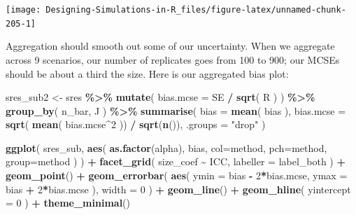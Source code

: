 \documentclass[
]{book}
\newenvironment{Shaded}{\begin{snugshade}}{\end{snugshade}}
\newcommand{\AttributeTok}[1]{\textcolor[rgb]{0.13,0.29,0.53}{#1}}
\newcommand{\DecValTok}[1]{\textcolor[rgb]{0.00,0.00,0.81}{#1}}
\newcommand{\FunctionTok}[1]{\textcolor[rgb]{0.13,0.29,0.53}{\textbf{#1}}}
\newcommand{\NormalTok}[1]{#1}
\newcommand{\OtherTok}[1]{\textcolor[rgb]{0.56,0.35,0.01}{#1}}
\newcommand{\SpecialCharTok}[1]{\textcolor[rgb]{0.81,0.36,0.00}{\textbf{#1}}}
\newcommand{\StringTok}[1]{\textcolor[rgb]{0.31,0.60,0.02}{#1}}
\begin{document}
\begin{center}\texttt{[image: Designing-Simulations-in-R\_files/figure-latex/unnamed-chunk-205-1]} \end{center}

Aggregation should smooth out some of our uncertainty.
When we aggregate across 9 scenarios, our number of replicates goes from 100 to 900; our MCSEs should be about a third the size.
Here is our aggregated bias plot:

\begin{Shaded}
\begin{Highlighting}[]
\NormalTok{sres\_sub2 }\OtherTok{\textless{}{-}}\NormalTok{ sres }\SpecialCharTok{\%\textgreater{}\%}
  \FunctionTok{mutate}\NormalTok{( }\AttributeTok{bias.mcse =}\NormalTok{ SE }\SpecialCharTok{/} \FunctionTok{sqrt}\NormalTok{( R ) ) }\SpecialCharTok{\%\textgreater{}\%}
  \FunctionTok{group\_by}\NormalTok{( n\_bar, J ) }\SpecialCharTok{\%\textgreater{}\%}
  \FunctionTok{summarise}\NormalTok{( }\AttributeTok{bias =} \FunctionTok{mean}\NormalTok{( bias ),}
             \AttributeTok{bias.mcse =} \FunctionTok{sqrt}\NormalTok{( }\FunctionTok{mean}\NormalTok{( bias.mcse}\SpecialCharTok{\^{}}\DecValTok{2}\NormalTok{ )) }\SpecialCharTok{/} \FunctionTok{sqrt}\NormalTok{(}\FunctionTok{n}\NormalTok{()),}
             \AttributeTok{.groups =} \StringTok{"drop"}\NormalTok{ )}

\FunctionTok{ggplot}\NormalTok{( sres\_sub, }\FunctionTok{aes}\NormalTok{( }\FunctionTok{as.factor}\NormalTok{(alpha), bias, }
                       \AttributeTok{col=}\NormalTok{method, }\AttributeTok{pch=}\NormalTok{method, }\AttributeTok{group=}\NormalTok{method ) ) }\SpecialCharTok{+}
  \FunctionTok{facet\_grid}\NormalTok{( size\_coef }\SpecialCharTok{\textasciitilde{}}\NormalTok{ ICC, }\AttributeTok{labeller =}\NormalTok{ label\_both ) }\SpecialCharTok{+}
  \FunctionTok{geom\_point}\NormalTok{() }\SpecialCharTok{+} 
  \FunctionTok{geom\_errorbar}\NormalTok{( }\FunctionTok{aes}\NormalTok{( }\AttributeTok{ymin =}\NormalTok{ bias }\SpecialCharTok{{-}} \DecValTok{2}\SpecialCharTok{*}\NormalTok{bias.mcse, }
                      \AttributeTok{ymax =}\NormalTok{ bias }\SpecialCharTok{+} \DecValTok{2}\SpecialCharTok{*}\NormalTok{bias.mcse ), }
                 \AttributeTok{width =} \DecValTok{0}\NormalTok{ ) }\SpecialCharTok{+}
  \FunctionTok{geom\_line}\NormalTok{() }\SpecialCharTok{+}
  \FunctionTok{geom\_hline}\NormalTok{( }\AttributeTok{yintercept =} \DecValTok{0}\NormalTok{ ) }\SpecialCharTok{+}
  \FunctionTok{theme\_minimal}\NormalTok{() }
\end{Highlighting}
\end{Shaded}
\end{document}
